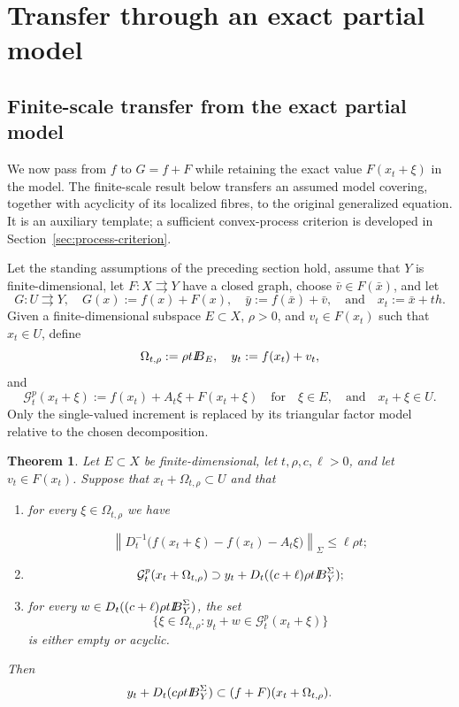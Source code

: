 \documentclass[11pt]{amsart}
\newtheorem{theorem}{Theorem}[section]
\theoremstyle{definition}
\theoremstyle{remark}
\newcommand{\tto}{\rightrightarrows}
\newcommand{\bx}{\bar x}
\newcommand{\by}{\bar y}
\newcommand{\bv}{\bar v}
\def\ball{{I\kern -.35em B}}
\begin{document}
	\section{Transfer through an exact partial model}
	\label{sec:partial-p-factor}
	
	\subsection{Finite-scale transfer from the exact partial model}
	
	We now pass from $f$ to $G=f+F$ while retaining the exact value
	$F(x_t+\xi)$ in the model. The finite-scale result below transfers an
	assumed model covering, together with acyclicity of its localized fibres,
	to the original generalized equation. It is an auxiliary template; a
	sufficient convex-process criterion is developed in
	Section~\ref{sec:process-criterion}.
	
	Let the standing assumptions of the preceding section hold, assume that
	$Y$ is finite-dimensional, let $F:X\tto Y$ have a closed graph, choose
	$\bv\in F(\bx)$, and let
	$$
	G:U\tto Y,\quad G(x):=f(x)+F(x),
	\quad
	\by:=f(\bx)+\bv,
	\quad\text{and}\quad
	x_t:=\bx+th.
	$$
	Given a finite-dimensional subspace $E\subset X$, $\rho>0$, and
	$v_t\in F(x_t)$ such that $x_t\in U$, define
	$$
	\Omega_{t,\rho}:=\rho t\ball_E,
	\quad
	y_t:=f(x_t)+v_t,
	$$
	and
	\begin{equation}
		\mathcal G_t^p(x_t+\xi)
		:=f(x_t)+A_t\xi+F(x_t+\xi)\quad\text{for}
		\quad \xi\in E,\quad\text{and}\quad x_t+\xi\in U.
		\label{eq:PG1}
	\end{equation}
	Only the single-valued increment is replaced by its triangular factor model
	relative to the chosen decomposition.
	
	\begin{theorem}
		\label{thm:p-partial-finite}
		Let $E\subset X$ be finite-dimensional, let $t,\rho,c,\ell>0$, and let
		$v_t\in F(x_t)$.  Suppose that $x_t+\Omega_{t,\rho}\subset U$ and that
		\begin{enumerate}[label={\rm (\roman*)}]
			\item for every $\xi\in\Omega_{t,\rho}$ we have
			
			$$
			\left\|D_t^{-1}\bigl(
			f(x_t+\xi)-f(x_t)-A_t\xi
			\bigr)\right\|_{\Sigma}
			\le\ell\rho t;
			$$
			\item
			$$
			\mathcal G_t^p(x_t+\Omega_{t,\rho})
			\supset
			y_t+D_t((c+\ell)\rho t\ball_Y^{\Sigma});
			$$
			\item for every $w\in D_t((c+\ell)\rho t\ball_Y^{\Sigma})$, the set
			$$
			\{\xi\in\Omega_{t,\rho}:
			y_t+w\in\mathcal G_t^p(x_t+\xi)\}
			$$
			is either empty or acyclic.
		\end{enumerate}
		Then
		\begin{equation}
			y_t+D_t(c\rho t\ball_Y^{\Sigma})
			\subset(f+F)(x_t+\Omega_{t,\rho}).
			\label{eq:PG5}
		\end{equation}
	\end{theorem}
	
\end{document}
